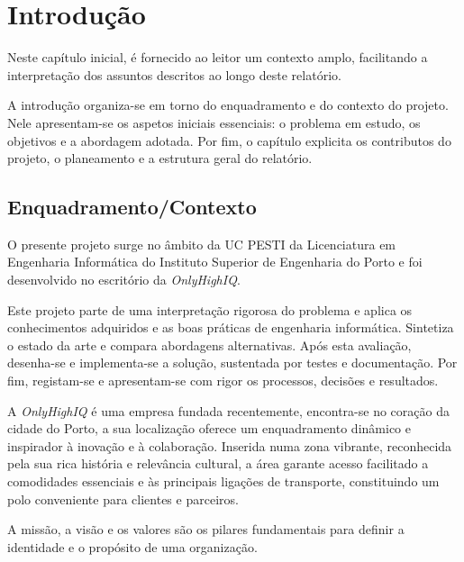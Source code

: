 % 
\chapter{Introdução} %
\label{chap:Introdução} %

Neste capítulo inicial, é fornecido ao leitor um contexto amplo, facilitando a interpretação dos assuntos descritos ao longo deste relatório.

A introdução organiza-se em torno do enquadramento e do contexto do projeto. Nele apresentam-se os aspetos iniciais essenciais: o problema em estudo, os objetivos e a abordagem adotada. Por fim, o capítulo explicita os contributos do projeto, o planeamento e a estrutura geral do relatório.




%
\section{Enquadramento/Contexto} 
\label{sec:chap1_introduction} %
O presente projeto surge no âmbito da \gls{UC} \gls{PESTI}
da Licenciatura em Engenharia Informática do Instituto Superior de Engenharia do Porto e
foi desenvolvido no escritório da \textit{OnlyHighIQ}.

Este projeto parte de uma interpretação rigorosa do problema e aplica os conhecimentos adquiridos e as boas práticas de engenharia informática. Sintetiza o estado da arte e compara abordagens alternativas. Após esta avaliação, desenha-se e implementa-se a solução, sustentada por testes e documentação. Por fim, registam-se e apresentam-se com rigor os processos, decisões e resultados.

A \textit{OnlyHighIQ} é uma empresa fundada recentemente, encontra-se no coração da cidade do Porto, a sua localização oferece um enquadramento dinâmico e inspirador à inovação e à colaboração. Inserida numa zona vibrante, reconhecida pela sua rica história e relevância cultural, a área garante acesso facilitado a comodidades essenciais e às principais ligações de transporte, constituindo um polo conveniente para clientes e parceiros. \cite{OYI}

A missão, a visão e os valores são os pilares fundamentais para definir a identidade e o propósito de uma organização.


